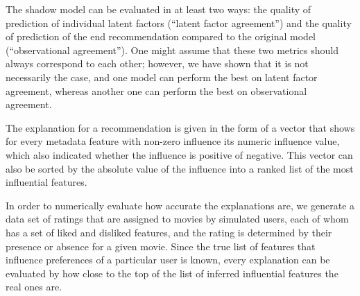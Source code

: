 The shadow model can be evaluated in at least two ways: the quality of
prediction of individual latent factors (``latent factor agreement'') and the
quality of prediction of the end recommendation compared to the original model
(``observational agreement''). One might assume that these two metrics should
always correspond to each other; however, we have shown that it is not
necessarily the case, and one model can perform the best on latent factor
agreement, whereas another one can perform the best on observational agreement.

The explanation for a recommendation is given in the form of a vector that shows
for every metadata feature with non-zero influence its numeric influence
value, which also indicated whether the influence is positive of negative. This
vector can also be sorted by the absolute value of the influence into a ranked
list of the most influential features.

In order to numerically evaluate how accurate the explanations are, we generate
a data set of ratings that are assigned to movies by simulated users, each of
whom has a set of liked and disliked features, and the rating is determined by
their presence or absence for a given movie. Since the true list of features
that influence preferences of a particular user is known, every explanation can
be evaluated by how close to the top of the list of inferred influential
features the real ones are.
